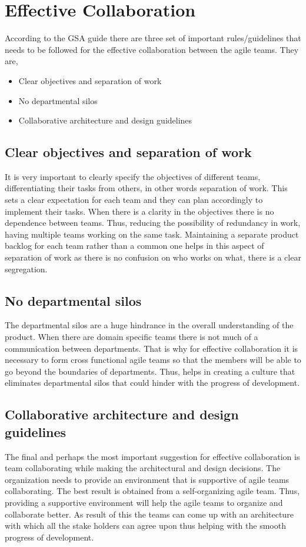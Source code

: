 \documentclass[sigconf]{acmart}
\begin{document}
\section{Effective Collaboration}

According to the GSA guide \cite{Gsa01} there are three set of important rules/guidelines that needs to be followed for the effective collaboration between the agile teams. They are,

\begin{itemize}
  \item Clear objectives and separation of work
  \item No departmental silos
  \item Collaborative architecture and design guidelines
\end{itemize}
\subsection{Clear objectives and separation of work}

It is very important to clearly specify the objectives of different teams, differentiating their tasks from others, in other words separation of work. This sets a clear expectation for each team and they can plan accordingly to implement their tasks. When there is a clarity in the objectives there is no dependence between teams. Thus, reducing the possibility of redundancy in work, having multiple teams working on the same task. Maintaining a separate product backlog for each team rather than a common one helps in this aspect of separation of work as there is no confusion on who works on what, there is a clear segregation.

\subsection{No departmental silos}
The departmental silos are a huge hindrance in the overall understanding of the product. When there are domain specific teams there is not much of a communication between departments. That is why for effective collaboration it is necessary to form cross functional agile teams so that the members will be able to go beyond the boundaries of departments. Thus, helps in creating a culture that eliminates departmental silos that could hinder with the progress of development.

\subsection {Collaborative architecture and design guidelines}
The final and perhaps the most important suggestion for effective collaboration is team collaborating while making the architectural and design decisions. The organization needs to provide an environment that is supportive of agile teams collaborating. The best result is obtained from a self-organizing agile team. Thus, providing a supportive environment will help the agile teams to organize and collaborate better. As result of this the teams can come up with an architecture with which all the stake holders can agree upon thus helping with the smooth progress of development.
\end{document}
